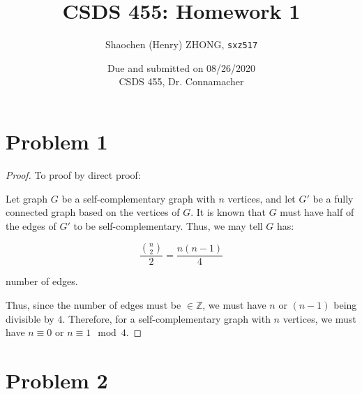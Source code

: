 \documentclass[12pt]{article}
\newcommand{\ilc}{\texttt}
\begin{document}
\title{\textbf{CSDS 455: Homework 1}}

\author{Shaochen (Henry) ZHONG, \ilc{sxz517}}
\date{Due and submitted on 08/26/2020 \\ CSDS 455, Dr. Connamacher}
\maketitle

\section{Problem 1}

\begin{proof}
To proof by direct proof:\newline

Let graph $G$ be a self-complementary graph with $n$ vertices, and let $G'$ be a fully connected graph based on the vertices of $G$. It is known that $G$ must have half of the edges of $G'$ to be self-complementary. Thus, we may tell $G$ has:

\begin{equation}
    \frac{{n \choose 2}}{2} = \frac{n(n-1)}{4} \nonumber
\end{equation}

number of edges.

Thus, since the number of edges must be $\in \mathbb{Z}$, we must have $n$ or $(n-1)$ being divisible by $4$. Therefore, for a self-complementary graph with $n$ vertices, we must have $n \equiv 0$ or $n \equiv 1 \mod 4$.
\end{proof}

\section{Problem 2}
\end{document}
